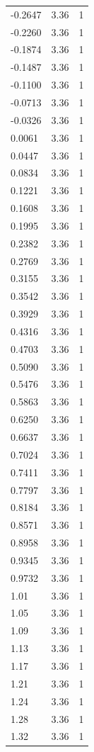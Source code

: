 \begin{longtable}{lrr}
  -0.2647 & 3.36 & 1 \\
  -0.2260 & 3.36 & 1 \\
  -0.1874 & 3.36 & 1 \\
  -0.1487 & 3.36 & 1 \\
  -0.1100 & 3.36 & 1 \\
  -0.0713 & 3.36 & 1 \\
  -0.0326 & 3.36 & 1 \\
  0.0061 & 3.36 & 1 \\
  0.0447 & 3.36 & 1 \\
  0.0834 & 3.36 & 1 \\
  0.1221 & 3.36 & 1 \\
  0.1608 & 3.36 & 1 \\
  0.1995 & 3.36 & 1 \\
  0.2382 & 3.36 & 1 \\
  0.2769 & 3.36 & 1 \\
  0.3155 & 3.36 & 1 \\
  0.3542 & 3.36 & 1 \\
  0.3929 & 3.36 & 1 \\
  0.4316 & 3.36 & 1 \\
  0.4703 & 3.36 & 1 \\
  0.5090 & 3.36 & 1 \\
  0.5476 & 3.36 & 1 \\
  0.5863 & 3.36 & 1 \\
  0.6250 & 3.36 & 1 \\
  0.6637 & 3.36 & 1 \\
  0.7024 & 3.36 & 1 \\
  0.7411 & 3.36 & 1 \\
  0.7797 & 3.36 & 1 \\
  0.8184 & 3.36 & 1 \\
  0.8571 & 3.36 & 1 \\
  0.8958 & 3.36 & 1 \\
  0.9345 & 3.36 & 1 \\
  0.9732 & 3.36 & 1 \\
  1.01 & 3.36 & 1 \\
  1.05 & 3.36 & 1 \\
  1.09 & 3.36 & 1 \\
  1.13 & 3.36 & 1 \\
  1.17 & 3.36 & 1 \\
  1.21 & 3.36 & 1 \\
  1.24 & 3.36 & 1 \\
  1.28 & 3.36 & 1 \\
  1.32 & 3.36 & 1 \\

\end{longtable}

